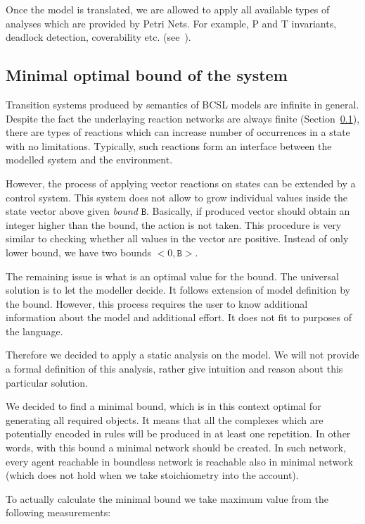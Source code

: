 \documentclass[12pt]{fithesis2}
\begin{document}
Once the model is translated, we are allowed to apply all available types of analyses which are provided by Petri Nets. For example, P and T invariants, deadlock detection, coverability etc. (see~\cite{petri}).

\subsection{Minimal optimal bound of the system}
\label{optimal_bound}

Transition systems produced by semantics of BCSL models are infinite in general. Despite the fact the underlaying reaction networks are always finite (Section~\ref{optimal_bound}), there are types of reactions which can increase number of occurrences in a state with no limitations. Typically, such reactions form an interface between the modelled system and the environment.

However, the process of applying vector reactions on states can be extended by a control system. This system does not allow to grow individual values inside the state vector above given \emph{bound} $\mathtt{B}$. Basically, if produced vector should obtain an integer higher than the bound, the action is not taken. This procedure is very similar to checking whether all values in the vector are positive. Instead of only lower bound, we have two bounds $<0, \mathtt{B}>$.

The remaining issue is what is an optimal value for the bound. The universal solution is to let the modeller decide. It follows extension of model definition by the bound. However, this process requires the user to know additional information about the model and additional effort. It does not fit to purposes of the language.

Therefore we decided to apply a static analysis on the model. We will not provide a formal definition of this analysis, rather give intuition and reason about this particular solution.

We decided to find a minimal bound, which is in this context optimal for generating all required objects. It means that all the complexes which are potentially encoded in rules  will be produced in at least one repetition. In other words, with this bound a minimal network should be created. In such network, every agent reachable in boundless network is reachable also in minimal network (which does not hold when we take stoichiometry into the account).

To actually calculate the minimal bound we take maximum value from the following measurements:
\end{document}

